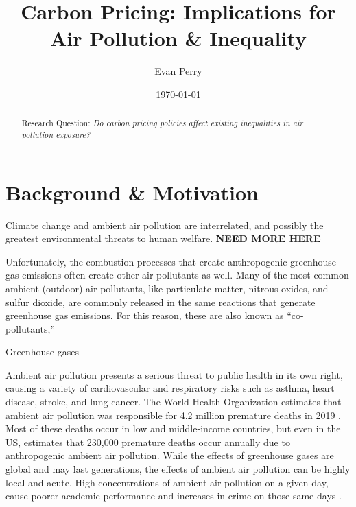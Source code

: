 \documentclass[11pt]{article}
\title{Carbon Pricing: Implications for Air Pollution \& Inequality}
\author{Evan Perry}
\date{\today}
\begin{document}
\maketitle

\renewcommand{\abstractname}{Summary}
\begin{abstract}
Research Question: \emph{Do carbon pricing policies affect existing inequalities in air pollution exposure?}
\end{abstract}

\doublespacing
\section*{Background \& Motivation}

Climate change and ambient air pollution are interrelated, and possibly the greatest environmental threats to human welfare. 
\textbf{NEED MORE HERE}

Unfortunately, the combustion processes that create anthropogenic greenhouse gas emissions often create other air pollutants as well. Many of the most common ambient (outdoor) air pollutants, like particulate matter, nitrous oxides, and sulfur dioxide, are commonly released in the same reactions that generate greenhouse gas emissions. For this reason, these are also known as ``co-pollutants,''

Greenhouse gases 




Ambient air pollution presents a serious threat to public health in its own right, causing a variety of cardiovascular and respiratory risks such as asthma, heart disease, stroke, and lung cancer. The World Health Organization estimates that ambient air pollution was responsible for 4.2 million premature deaths in 2019 \cite{who_factsheet}. Most of these deaths occur in low and middle-income countries, but even in the US, \cite{lelieveld2019effects} estimates that 230,000 premature deaths occur annually due to anthropogenic ambient air pollution. While the effects of greenhouse gases are global and may last generations, the effects of ambient air pollution can be highly local and acute. High concentrations of ambient air pollution on a given day, cause poorer academic performance and increases in crime on those same days \citep{ebenstein2016long, bondy2020crime}.
\end{document}
